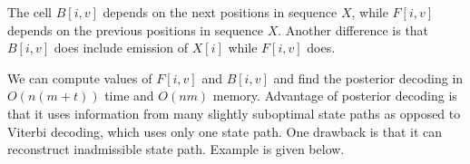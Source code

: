 The cell $B[i,v]$ depends on the next positions in sequence $X$,
while $F[i,v]$ depends on the previous positions in sequence $X$. Another
difference is that $B[i,v]$ does include emission of $X[i]$ while $F[i,v]$ does.

We can compute values of $F[i,v]$ and $B[i,v]$ and find the posterior decoding
in $O(n(m+t))$ time and $O(nm)$ memory.  Advantage of posterior decoding is
that it uses information from many slightly suboptimal state paths as opposed
to Viterbi decoding, which uses only one state path. One drawback is that it
can reconstruct inadmissible state path. Example is given below.



